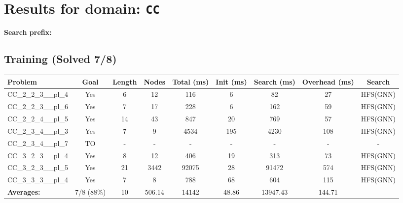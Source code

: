 \documentclass{article}
\begin{document}
\section*{Results for domain: \texttt{CC}}
\textbf{Search prefix:} 
\\[0.5cm]
\subsection*{Training (Solved 7/8)}
\begin{tabular}{lcccccccc}
\toprule
Problem & Goal & Length & Nodes & Total (ms) & Init (ms) & Search (ms) & Overhead (ms) & Search \\
\midrule
CC\_2\_2\_3\_\_pl\_4 & Yes & 6 & 12 & 116 & 6 & 82 & 27 & HFS(GNN) \\
CC\_2\_2\_3\_\_pl\_6 & Yes & 7 & 17 & 228 & 6 & 162 & 59 & HFS(GNN) \\
CC\_2\_2\_4\_\_pl\_5 & Yes & 14 & 43 & 847 & 20 & 769 & 57 & HFS(GNN) \\
CC\_2\_3\_4\_\_pl\_3 & Yes & 7 & 9 & 4534 & 195 & 4230 & 108 & HFS(GNN) \\
CC\_2\_3\_4\_\_pl\_7 & TO & - & - & - & - & - & - & - \\
CC\_3\_2\_3\_\_pl\_4 & Yes & 8 & 12 & 406 & 19 & 313 & 73 & HFS(GNN) \\
CC\_3\_2\_3\_\_pl\_5 & Yes & 21 & 3442 & 92075 & 28 & 91472 & 574 & HFS(GNN) \\
CC\_3\_3\_3\_\_pl\_4 & Yes & 7 & 8 & 788 & 68 & 604 & 115 & HFS(GNN) \\
\textbf{Averages:} & 7/8 (88\%) & 10 & 506.14 & 14142 & 48.86 & 13947.43 & 144.71 & \\
\bottomrule
\end{tabular}
\\[0.7cm]
\end{document}
